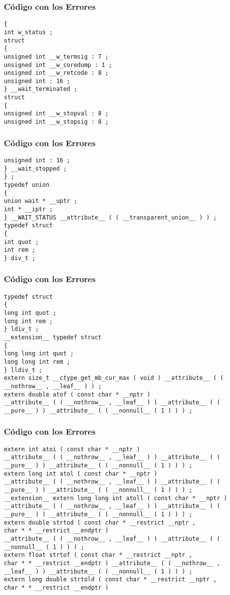 \documentclass{beamer}
\begin{document}
\begin{frame}[fragile]
\frametitle{C\'odigo con los Errores}
\begin{lstlisting}[style=CStyle]
{ 
int w_status ; 
struct 
{ 
unsigned int __w_termsig : 7 ; 
unsigned int __w_coredump : 1 ; 
unsigned int __w_retcode : 8 ; 
unsigned int : 16 ; 
} __wait_terminated ; 
struct 
{ 
unsigned int __w_stopval : 8 ; 
unsigned int __w_stopsig : 8 ; 
\end{lstlisting}
\end{frame}
\begin{frame}[fragile]
\frametitle{C\'odigo con los Errores}
\begin{lstlisting}[style=CStyle]
unsigned int : 16 ; 
} __wait_stopped ; 
} ; 
typedef union 
{ 
union wait * __uptr ; 
int * __iptr ; 
} __WAIT_STATUS __attribute__ ( ( __transparent_union__ ) ) ; 
typedef struct 
{ 
int quot ; 
int rem ; 
} div_t ; 
\end{lstlisting}
\end{frame}
\begin{frame}[fragile]
\frametitle{C\'odigo con los Errores}
\begin{lstlisting}[style=CStyle]
typedef struct 
{ 
long int quot ; 
long int rem ; 
} ldiv_t ; 
__extension__ typedef struct 
{ 
long long int quot ; 
long long int rem ; 
} lldiv_t ; 
extern size_t __ctype_get_mb_cur_max ( void ) __attribute__ ( ( __nothrow__ , __leaf__ ) ) ; 
extern double atof ( const char * __nptr ) 
__attribute__ ( ( __nothrow__ , __leaf__ ) ) __attribute__ ( ( __pure__ ) ) __attribute__ ( ( __nonnull__ ( 1 ) ) ) ; 
\end{lstlisting}
\end{frame}
\begin{frame}[fragile]
\frametitle{C\'odigo con los Errores}
\begin{lstlisting}[style=CStyle]
extern int atoi ( const char * __nptr ) 
__attribute__ ( ( __nothrow__ , __leaf__ ) ) __attribute__ ( ( __pure__ ) ) __attribute__ ( ( __nonnull__ ( 1 ) ) ) ; 
extern long int atol ( const char * __nptr ) 
__attribute__ ( ( __nothrow__ , __leaf__ ) ) __attribute__ ( ( __pure__ ) ) __attribute__ ( ( __nonnull__ ( 1 ) ) ) ; 
__extension__ extern long long int atoll ( const char * __nptr ) 
__attribute__ ( ( __nothrow__ , __leaf__ ) ) __attribute__ ( ( __pure__ ) ) __attribute__ ( ( __nonnull__ ( 1 ) ) ) ; 
extern double strtod ( const char * __restrict __nptr , 
char * * __restrict __endptr ) 
__attribute__ ( ( __nothrow__ , __leaf__ ) ) __attribute__ ( ( __nonnull__ ( 1 ) ) ) ; 
extern float strtof ( const char * __restrict __nptr , 
char * * __restrict __endptr ) __attribute__ ( ( __nothrow__ , __leaf__ ) ) __attribute__ ( ( __nonnull__ ( 1 ) ) ) ; 
extern long double strtold ( const char * __restrict __nptr , 
char * * __restrict __endptr ) 
\end{lstlisting}
\end{frame}
\end{document}
